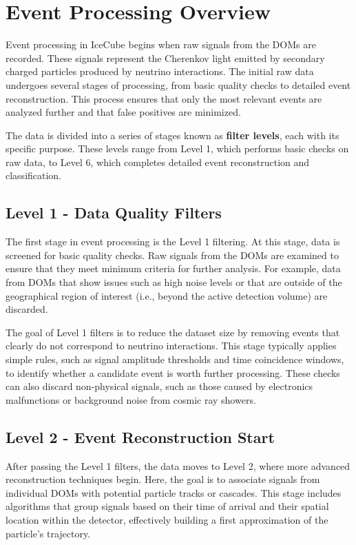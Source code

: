 \documentclass[a4paper,12pt,numbered]{article}
\begin{document}
\section{Event Processing Overview}
Event processing in IceCube begins when raw signals from the DOMs are recorded. These signals represent the Cherenkov light emitted by secondary charged particles produced by neutrino interactions. The initial raw data undergoes several stages of processing, from basic quality checks to detailed event reconstruction. This process ensures that only the most relevant events are analyzed further and that false positives are minimized.

The data is divided into a series of stages known as \textbf{filter levels}, each with its specific purpose. These levels range from Level 1, which performs basic checks on raw data, to Level 6, which completes detailed event reconstruction and classification.

\subsection{Level 1 - Data Quality Filters}
The first stage in event processing is the Level 1 filtering. At this stage, data is screened for basic quality checks. Raw signals from the DOMs are examined to ensure that they meet minimum criteria for further analysis. For example, data from DOMs that show issues such as high noise levels or that are outside of the geographical region of interest (i.e., beyond the active detection volume) are discarded.

The goal of Level 1 filters is to reduce the dataset size by removing events that clearly do not correspond to neutrino interactions. This stage typically applies simple rules, such as signal amplitude thresholds and time coincidence windows, to identify whether a candidate event is worth further processing. These checks can also discard non-physical signals, such as those caused by electronics malfunctions or background noise from cosmic ray showers.

\subsection{Level 2 - Event Reconstruction Start}
After passing the Level 1 filters, the data moves to Level 2, where more advanced reconstruction techniques begin. Here, the goal is to associate signals from individual DOMs with potential particle tracks or cascades. This stage includes algorithms that group signals based on their time of arrival and their spatial location within the detector, effectively building a first approximation of the particle's trajectory.
\end{document}
